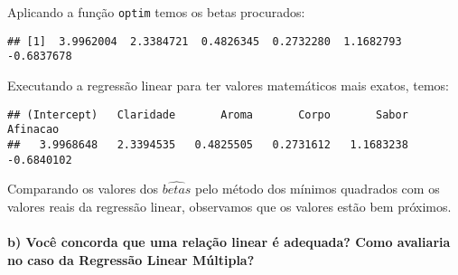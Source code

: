 \documentclass[
]{article}
\newenvironment{Shaded}{\begin{snugshade}}{\end{snugshade}}
\newcommand{\DataTypeTok}[1]{\textcolor[rgb]{0.13,0.29,0.53}{#1}}
\newcommand{\DecValTok}[1]{\textcolor[rgb]{0.00,0.00,0.81}{#1}}
\newcommand{\FloatTok}[1]{\textcolor[rgb]{0.00,0.00,0.81}{#1}}
\newcommand{\KeywordTok}[1]{\textcolor[rgb]{0.13,0.29,0.53}{\textbf{#1}}}
\newcommand{\NormalTok}[1]{#1}
\newcommand{\OperatorTok}[1]{\textcolor[rgb]{0.81,0.36,0.00}{\textbf{#1}}}
\newcommand{\StringTok}[1]{\textcolor[rgb]{0.31,0.60,0.02}{#1}}
\begin{document}
Aplicando a função \texttt{optim} temos os betas procurados:

\begin{Shaded}
\end{Shaded}

\begin{verbatim}
## [1]  3.9962004  2.3384721  0.4826345  0.2732280  1.1682793 -0.6837678
\end{verbatim}

Executando a regressão linear para ter valores matemáticos mais exatos,
temos:

\begin{Shaded}
\end{Shaded}

\begin{verbatim}
## (Intercept)   Claridade       Aroma       Corpo       Sabor    Afinacao 
##   3.9968648   2.3394535   0.4825505   0.2731612   1.1683238  -0.6840102
\end{verbatim}

Comparando os valores dos \(\widehat{betas}\) pelo método dos mínimos
quadrados com os valores reais da regressão linear, observamos que os
valores estão bem próximos.

\hypertarget{b-vocuxea-concorda-que-uma-relauxe7uxe3o-linear-uxe9-adequada-como-avaliaria-no-caso-da-regressuxe3o-linear-muxfaltipla}{%
\paragraph{\texorpdfstring{\textbf{b) Você concorda que uma relação
linear é adequada? Como avaliaria no caso da Regressão Linear
Múltipla?}}{b) Você concorda que uma relação linear é adequada? Como avaliaria no caso da Regressão Linear Múltipla?}}\label{b-vocuxea-concorda-que-uma-relauxe7uxe3o-linear-uxe9-adequada-como-avaliaria-no-caso-da-regressuxe3o-linear-muxfaltipla}}
\end{document}
